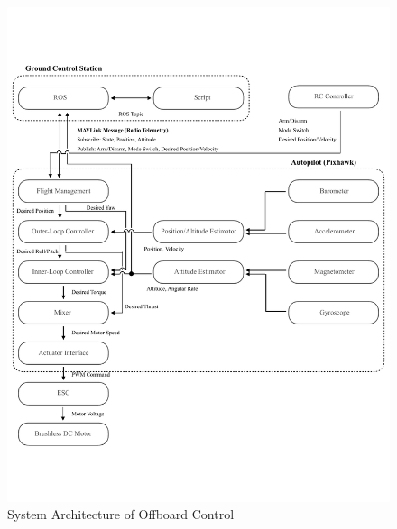 \begin{figure}
    \centering
    \includegraphics[width=1.0\textwidth]{graphics/architecture_01.pdf}
    \caption{System Architecture of Offboard Control}
    \label{fig:overview_01}
\end{figure}

